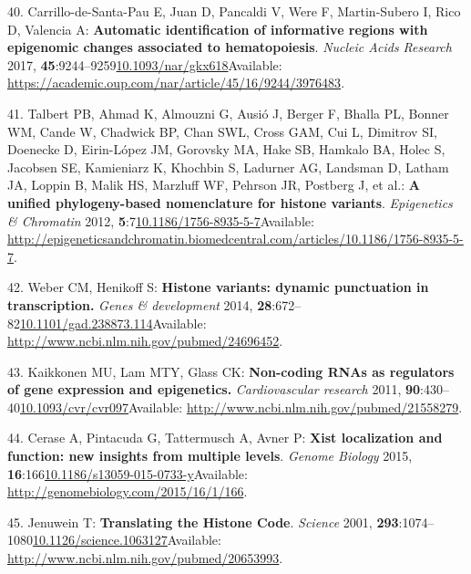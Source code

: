 \documentclass[
]{book}
\begin{document}
\leavevmode\hypertarget{ref-Carrillo-de-Santa-Pau2017}{}%
40. Carrillo-de-Santa-Pau E, Juan D, Pancaldi V, Were F, Martin-Subero I, Rico D, Valencia A: \textbf{Automatic identification of informative regions with epigenomic changes associated to hematopoiesis}. \emph{Nucleic Acids Research} 2017, \textbf{45}:9244--9259\href{https://doi.org/10.1093/nar/gkx618}{10.1093/nar/gkx618}Available: \url{https://academic.oup.com/nar/article/45/16/9244/3976483}.

\leavevmode\hypertarget{ref-Talbert2012}{}%
41. Talbert PB, Ahmad K, Almouzni G, Ausió J, Berger F, Bhalla PL, Bonner WM, Cande W, Chadwick BP, Chan SWL, Cross GAM, Cui L, Dimitrov SI, Doenecke D, Eirin-López JM, Gorovsky MA, Hake SB, Hamkalo BA, Holec S, Jacobsen SE, Kamieniarz K, Khochbin S, Ladurner AG, Landsman D, Latham JA, Loppin B, Malik HS, Marzluff WF, Pehrson JR, Postberg J, et al.: \textbf{A unified phylogeny-based nomenclature for histone variants}. \emph{Epigenetics \& Chromatin} 2012, \textbf{5}:7\href{https://doi.org/10.1186/1756-8935-5-7}{10.1186/1756-8935-5-7}Available: \url{http://epigeneticsandchromatin.biomedcentral.com/articles/10.1186/1756-8935-5-7}.

\leavevmode\hypertarget{ref-Weber2014}{}%
42. Weber CM, Henikoff S: \textbf{Histone variants: dynamic punctuation in transcription.} \emph{Genes \& development} 2014, \textbf{28}:672--82\href{https://doi.org/10.1101/gad.238873.114}{10.1101/gad.238873.114}Available: \url{http://www.ncbi.nlm.nih.gov/pubmed/24696452}.

\leavevmode\hypertarget{ref-Kaikkonen2011}{}%
43. Kaikkonen MU, Lam MTY, Glass CK: \textbf{Non-coding RNAs as regulators of gene expression and epigenetics.} \emph{Cardiovascular research} 2011, \textbf{90}:430--40\href{https://doi.org/10.1093/cvr/cvr097}{10.1093/cvr/cvr097}Available: \url{http://www.ncbi.nlm.nih.gov/pubmed/21558279}.

\leavevmode\hypertarget{ref-Cerase2015}{}%
44. Cerase A, Pintacuda G, Tattermusch A, Avner P: \textbf{Xist localization and function: new insights from multiple levels}. \emph{Genome Biology} 2015, \textbf{16}:166\href{https://doi.org/10.1186/s13059-015-0733-y}{10.1186/s13059-015-0733-y}Available: \url{http://genomebiology.com/2015/16/1/166}.

\leavevmode\hypertarget{ref-Haluskova2010}{}%
45. Jenuwein T: \textbf{Translating the Histone Code}. \emph{Science} 2001, \textbf{293}:1074--1080\href{https://doi.org/10.1126/science.1063127}{10.1126/science.1063127}Available: \url{http://www.ncbi.nlm.nih.gov/pubmed/20653993}.
\end{document}
